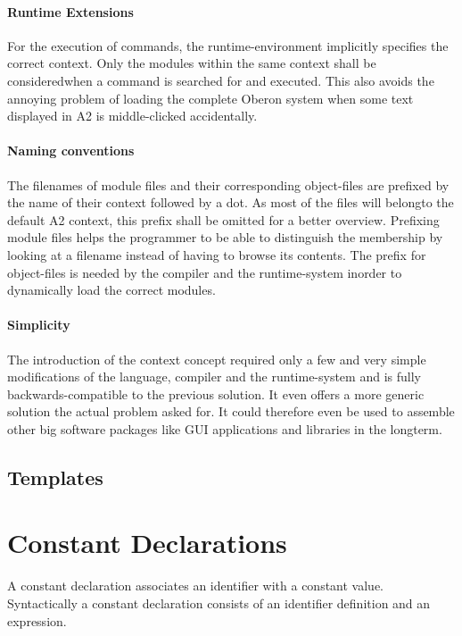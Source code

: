 \documentclass[a4wide,11pt]{article}
\begin{document}
\begin{annotation}
\paragraph{Runtime Extensions}
For the execution of commands, the runtime-environment implicitly specifies the correct context.
Only the modules within the same context shall be consideredwhen a command is searched for and executed.
This also avoids the annoying problem of loading the complete Oberon system when some text displayed in A2 is middle-clicked accidentally.

\paragraph{Naming conventions}
The filenames of module files and their corresponding object-files are prefixed by the name of their context followed by a dot.
As most of the files will belongto the default A2 context, this prefix shall be omitted for a better overview.
Prefixing module files helps the programmer to be able to distinguish the membership by looking at a filename instead of having to browse its contents.
The prefix for object-files is needed by the compiler and the runtime-system inorder to dynamically load the correct modules.

\paragraph{Simplicity} The  introduction  of  the  context  concept  required only  a  few  and  very  simple modifications  of  the  language,  compiler  and  the  runtime-system  and  is  fully backwards-compatible  to  the  previous  solution.
It  even  offers  a  more  generic solution the actual problem asked for.
It could therefore even be used to assemble other big software packages like GUI applications and libraries in the longterm.

\subsection{Templates}
\end{annotation}


\section{Constant Declarations}
A constant declaration associates an identifier with a constant value.
Syntactically a constant declaration consists of an identifier definition and an expression.
\end{document}
